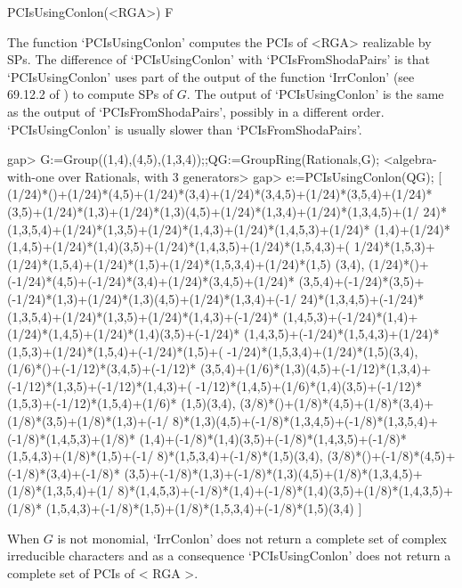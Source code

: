 \>PCIsUsingConlon(<RGA>) F

The function `PCIsUsingConlon' computes the PCIs of <RGA> realizable by 
SPs. The difference of `PCIsUsingConlon' with `PCIsFromShodaPairs' is that 
`PCIsUsingConlon' uses part of the output of the function `IrrConlon' (see 
69.12.2 of \cite{GapManual}) to compute SPs of $G$. The output of 
`PCIsUsingConlon' is the same as the output of `PCIsFromShodaPairs', 
possibly in a different order. `PCIsUsingConlon' is usually slower than 
`PCIsFromShodaPairs'. 

\beginexample
    gap> G:=Group((1,4),(4,5),(1,3,4));;QG:=GroupRing(Rationals,G);
    <algebra-with-one over Rationals, with 3 generators>
    gap> e:=PCIsUsingConlon(QG);
        [ (1/24)*()+(1/24)*(4,5)+(1/24)*(3,4)+(1/24)*(3,4,5)+(1/24)*(3,5,4)+(1/24)*
        (3,5)+(1/24)*(1,3)+(1/24)*(1,3)(4,5)+(1/24)*(1,3,4)+(1/24)*(1,3,4,5)+(1/
        24)*(1,3,5,4)+(1/24)*(1,3,5)+(1/24)*(1,4,3)+(1/24)*(1,4,5,3)+(1/24)*
        (1,4)+(1/24)*(1,4,5)+(1/24)*(1,4)(3,5)+(1/24)*(1,4,3,5)+(1/24)*(1,5,4,3)+(
        1/24)*(1,5,3)+(1/24)*(1,5,4)+(1/24)*(1,5)+(1/24)*(1,5,3,4)+(1/24)*(1,5)
        (3,4), (1/24)*()+(-1/24)*(4,5)+(-1/24)*(3,4)+(1/24)*(3,4,5)+(1/24)*
        (3,5,4)+(-1/24)*(3,5)+(-1/24)*(1,3)+(1/24)*(1,3)(4,5)+(1/24)*(1,3,4)+(-1/
        24)*(1,3,4,5)+(-1/24)*(1,3,5,4)+(1/24)*(1,3,5)+(1/24)*(1,4,3)+(-1/24)*
        (1,4,5,3)+(-1/24)*(1,4)+(1/24)*(1,4,5)+(1/24)*(1,4)(3,5)+(-1/24)*
        (1,4,3,5)+(-1/24)*(1,5,4,3)+(1/24)*(1,5,3)+(1/24)*(1,5,4)+(-1/24)*(1,5)+(
        -1/24)*(1,5,3,4)+(1/24)*(1,5)(3,4), (1/6)*()+(-1/12)*(3,4,5)+(-1/12)*
        (3,5,4)+(1/6)*(1,3)(4,5)+(-1/12)*(1,3,4)+(-1/12)*(1,3,5)+(-1/12)*(1,4,3)+(
        -1/12)*(1,4,5)+(1/6)*(1,4)(3,5)+(-1/12)*(1,5,3)+(-1/12)*(1,5,4)+(1/6)*
        (1,5)(3,4), (3/8)*()+(1/8)*(4,5)+(1/8)*(3,4)+(1/8)*(3,5)+(1/8)*(1,3)+(-1/
        8)*(1,3)(4,5)+(-1/8)*(1,3,4,5)+(-1/8)*(1,3,5,4)+(-1/8)*(1,4,5,3)+(1/8)*
        (1,4)+(-1/8)*(1,4)(3,5)+(-1/8)*(1,4,3,5)+(-1/8)*(1,5,4,3)+(1/8)*(1,5)+(-1/
        8)*(1,5,3,4)+(-1/8)*(1,5)(3,4), (3/8)*()+(-1/8)*(4,5)+(-1/8)*(3,4)+(-1/8)*
        (3,5)+(-1/8)*(1,3)+(-1/8)*(1,3)(4,5)+(1/8)*(1,3,4,5)+(1/8)*(1,3,5,4)+(1/
        8)*(1,4,5,3)+(-1/8)*(1,4)+(-1/8)*(1,4)(3,5)+(1/8)*(1,4,3,5)+(1/8)*
        (1,5,4,3)+(-1/8)*(1,5)+(1/8)*(1,5,3,4)+(-1/8)*(1,5)(3,4) ]
\endexample

When $G$ is not monomial, `IrrConlon' does not return a complete set of complex irreducible 
characters and as a consequence `PCIsUsingConlon' does not return a complete set of PCIs of < 
RGA >. 

